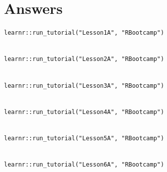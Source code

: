 \documentclass[
]{book}
\begin{document}
\hypertarget{answers}{%
\section{Answers}\label{answers}}

\texttt{learnr::run\_tutorial("Lesson1A",\ "RBootcamp")}\strut \\
\texttt{learnr::run\_tutorial("Lesson2A",\ "RBootcamp")}\strut \\
\texttt{learnr::run\_tutorial("Lesson3A",\ "RBootcamp")}\strut \\
\texttt{learnr::run\_tutorial("Lesson4A",\ "RBootcamp")}\strut \\
\texttt{learnr::run\_tutorial("Lesson5A",\ "RBootcamp")}\strut \\
\texttt{learnr::run\_tutorial("Lesson6A",\ "RBootcamp")}

  
\end{document}
